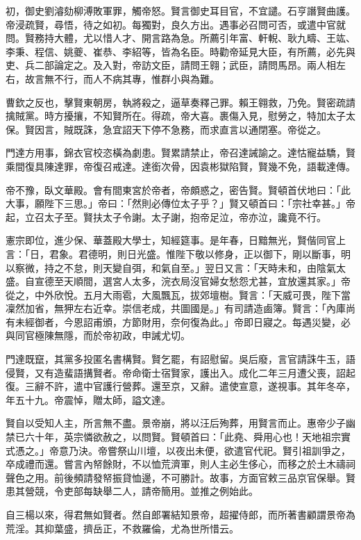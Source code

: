 \begin{pinyinscope}
初，御史劉濬劾柳溥敗軍罪，觸帝怒。賢言御史耳目官，不宜譴。石亨譖賢曲護。帝浸疏賢，尋悟，待之如初。每獨對，良久方出。遇事必召問可否，或遣中官就問。賢務持大體，尤以惜人才、開言路為急。所薦引年富、軒輗、耿九疇、王竑、李秉、程信、姚夔、崔恭、李紹等，皆為名臣。時勸帝延見大臣，有所薦，必先與吏、兵二部論定之。及入對，帝訪文臣，請問王翱；武臣，請問馬昂。兩人相左右，故言無不行，而人不病其專，惟群小與為難。

曹欽之反也，擊賢東朝房，執將殺之，逼草奏釋己罪。賴王翱救，乃免。賢密疏請擒賊黨。時方擾攘，不知賢所在。得疏，帝大喜。裹傷入見，慰勞之，特加太子太保。賢因言，賊既誅，急宜詔天下停不急務，而求直言以通閉塞。帝從之。

門達方用事，錦衣官校恣橫為劇患。賢累請禁止，帝召達誡諭之。達怙寵益驕，賢乘間復具陳達罪，帝復召戒達。達銜次骨，因袁彬獄陷賢，賢幾不免，語載達傳。

帝不豫，臥文華殿。會有間東宮於帝者，帝頗惑之，密告賢。賢頓首伏地曰：「此大事，願陛下三思。」帝曰：「然則必傳位太子乎？」賢又頓首曰：「宗社幸甚。」帝起，立召太子至。賢扶太子令謝。太子謝，抱帝足泣，帝亦泣，讒竟不行。

憲宗即位，進少保、華蓋殿大學士，知經筵事。是年春，日黯無光，賢偕同官上言：「日，君象。君德明，則日光盛。惟陛下敬以修身，正以御下，剛以斷事，明以察微，持之不怠，則天變自弭，和氣自至。」翌日又言：「天時未和，由陰氣太盛。自宣德至天順間，選宮人太多，浣衣局沒官婦女愁怨尤甚，宜放還其家。」帝從之，中外欣悅。五月大雨雹，大風飄瓦，拔郊壇樹。賢言：「天威可畏，陛下當凜然加省，無狎左右近幸。崇信老成，共圖國是。」有司請造鹵簿。賢言：「內庫尚有未經御者，今恩詔甫頒，方節財用，奈何復為此。」帝即日寢之。每遇災變，必與同官極陳無隱，而於帝初政，申誡尤切。

門達既竄，其黨多投匿名書構賢。賢乞罷，有詔慰留。吳后廢，言官請誅牛玉，語侵賢，又有造蜚語搆賢者。帝命衛士宿賢家，護出入。成化二年三月遭父喪，詔起復。三辭不許，遣中官護行營葬。還至京，又辭。遣使宣意，遂視事。其年冬卒，年五十九。帝震悼，贈太師，謚文達。

賢自以受知人主，所言無不盡。景帝崩，將以汪后殉葬，用賢言而止。惠帝少子幽禁已六十年，英宗憐欲赦之，以問賢。賢頓首曰：「此堯、舜用心也！天地祖宗實式憑之。」帝意乃決。帝嘗祭山川壇，以夜出未便，欲遣官代祀。賢引祖訓爭之，卒成禮而還。嘗言內帑餘財，不以恤荒濟軍，則人主必生侈心，而移之於土木禱祠聲色之用。前後頻請發帑振貸恤邊，不可勝計。故事，方面官敕三品京官保舉。賢患其營競，令吏部每缺舉二人，請帝簡用。並推之例始此。

自三楊以來，得君無如賢者。然自郎署結知景帝，超擢侍郎，而所著書顧謂景帝為荒淫。其抑葉盛，擠岳正，不救羅倫，尤為世所惜云。


\end{pinyinscope}
